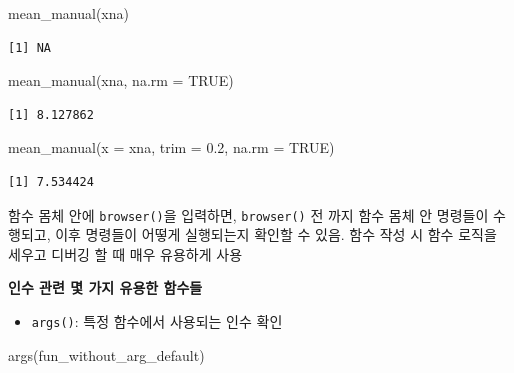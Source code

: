 \documentclass[
  11pt,
]{krantz}
\makeatletter
\newenvironment{Shaded}{\begin{snugshade}}{\end{snugshade}}
\newcommand{\AttributeTok}[1]{\textcolor[rgb]{0.61,0.61,0.61}{#1}}
\newcommand{\ConstantTok}[1]{\textcolor[rgb]{0,0,0}{#1}}
\newcommand{\FloatTok}[1]{\textcolor[rgb]{0.06,0.06,0.06}{#1}}
\newcommand{\FunctionTok}[1]{\textcolor[rgb]{0,0,0}{#1}}
\newcommand{\NormalTok}[1]{#1}
\providecommand{\tightlist}{%
  \setlength{\itemsep}{0pt}\setlength{\parskip}{0pt}}
\newenvironment{kframe}{%
\medskip{}
\setlength{\fboxsep}{.8em}
 \def\at@end@of@kframe{}%
 \ifinner\ifhmode%
  \def\at@end@of@kframe{\end{minipage}}%
  \begin{minipage}{\columnwidth}%
 \fi\fi%
 \def\FrameCommand##1{\hskip\@totalleftmargin \hskip-\fboxsep
 \colorbox{shadecolor}{##1}\hskip-\fboxsep
     \hskip-\linewidth \hskip-\@totalleftmargin \hskip\columnwidth}%
 \MakeFramed {\advance\hsize-\width
   \@totalleftmargin\z@ \linewidth\hsize
   \@setminipage}}%
 {\par\unskip\endMakeFramed%
 \at@end@of@kframe}
\newenvironment{rmdblock}[1]
  {
  \begin{itemize}
  \renewcommand{\labelitemi}{
    \raisebox{-.7\height}[0pt][0pt]{
      {\setkeys{Gin}{width=3em,keepaspectratio}\texttt{[image: images/\#1]}}
    }
  }
  \setlength{\fboxsep}{1em}
  \begin{kframe}
  \item
  }
  {
  \end{kframe}
  \end{itemize}
  }
\newenvironment{rmdtip}
  {\begin{rmdblock}{tip}}
  {\end{rmdblock}}
\makeatother
\begin{document}
\begin{Shaded}
\begin{Highlighting}[]
\FunctionTok{mean\_manual}\NormalTok{(xna)}
\end{Highlighting}
\end{Shaded}

\begin{verbatim}
[1] NA
\end{verbatim}

\begin{Shaded}
\begin{Highlighting}[]
\FunctionTok{mean\_manual}\NormalTok{(xna, }\AttributeTok{na.rm =} \ConstantTok{TRUE}\NormalTok{)}
\end{Highlighting}
\end{Shaded}

\begin{verbatim}
[1] 8.127862
\end{verbatim}

\begin{Shaded}
\begin{Highlighting}[]
\FunctionTok{mean\_manual}\NormalTok{(}\AttributeTok{x =}\NormalTok{ xna, }\AttributeTok{trim =} \FloatTok{0.2}\NormalTok{, }\AttributeTok{na.rm =} \ConstantTok{TRUE}\NormalTok{)}
\end{Highlighting}
\end{Shaded}

\begin{verbatim}
[1] 7.534424
\end{verbatim}

\normalsize

\footnotesize

\begin{rmdtip}
함수 몸체 안에 \texttt{browser()}을 입력하면, \texttt{browser()} 전 까지 함수 몸체 안 명령들이 수행되고, 이후 명령들이 어떻게 실행되는지 확인할 수 있음. 함수 작성 시 함수 로직을 세우고 디버깅 할 때 매우 유용하게 사용
\end{rmdtip}

\normalsize

\textbf{인수 관련 몇 가지 유용한 함수들}

\begin{itemize}
\tightlist
\item
  \texttt{args()}: 특정 함수에서 사용되는 인수 확인
\end{itemize}

\footnotesize

\begin{Shaded}
\begin{Highlighting}[]
\FunctionTok{args}\NormalTok{(fun\_without\_arg\_default)}
\end{Highlighting}
\end{Shaded}
\end{document}
